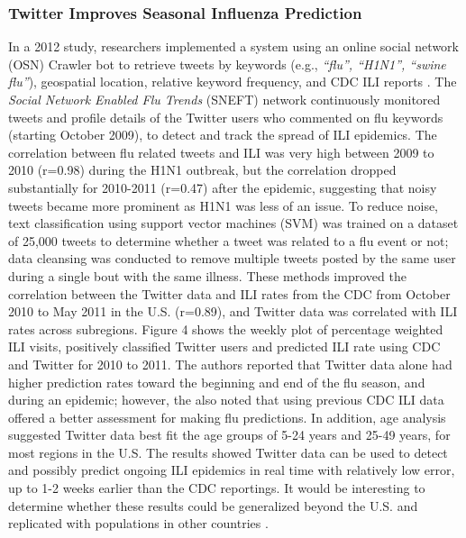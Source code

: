 \documentclass[sigconf]{acmart}
\begin{document}
\subsubsection{Twitter Improves Seasonal Influenza Prediction}

In a 2012 study, researchers implemented a system using an online social network (OSN)
Crawler bot to retrieve tweets by keywords (e.g., {\it ``flu'', ``H1N1'', ``swine flu''}), 
geospatial location, relative keyword frequency, and CDC ILI reports \cite{achrekar12}. 
The {\it Social Network Enabled Flu Trends} (SNEFT) network continuously monitored tweets 
and profile details of the Twitter users who commented on flu keywords (starting October 
2009), to detect and track the spread of ILI epidemics. The correlation between flu related 
tweets and ILI was very high between 2009 to 2010 (r=0.98) during the H1N1 outbreak, but 
the correlation dropped substantially for 2010-2011 (r=0.47) after the epidemic, suggesting 
that noisy tweets became more prominent as H1N1 was less of an issue. To reduce noise, text 
classification using support vector machines (SVM) was trained on a dataset of 25,000 tweets 
to determine whether a tweet was related to a flu event or not; data cleansing was conducted 
to remove multiple tweets posted by the same user during a single bout with the same illness. 
These methods improved the correlation between the Twitter data and ILI rates from the CDC 
from October 2010 to May 2011 in the U.S. (r=0.89), and Twitter data was correlated with 
ILI rates across subregions. Figure 4 shows the weekly plot of percentage weighted ILI visits, 
positively classified Twitter users and predicted ILI rate using CDC and Twitter for 2010 
to 2011. The authors reported that Twitter data alone had higher prediction rates toward 
the beginning and end of the flu season, and during an epidemic; however, the also noted 
that using previous CDC ILI data offered a better assessment for making flu predictions. 
In addition, age analysis suggested Twitter data best fit the age groups of 5-24 years 
and 25-49 years,  for most regions in the U.S. The results showed Twitter data can be used 
to detect and possibly predict ongoing ILI epidemics in real time with relatively low error, 
up to 1-2 weeks earlier than the CDC reportings. It would be interesting to determine 
whether these results could be generalized beyond the U.S. and replicated with populations 
in other countries \cite{yuan13}.
\end{document}
